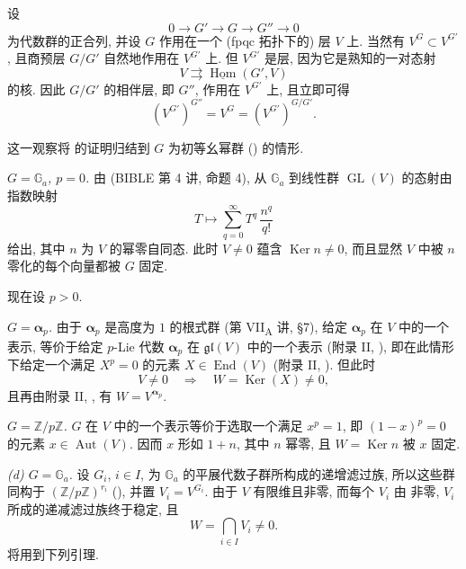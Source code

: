 设
\[
  0\longrightarrow G'\longrightarrow G\longrightarrow G''
    \longrightarrow0
\]
为代数群的正合列, 并设 \(G\) 作用在一个 (fpqc 拓扑下的) 层 \(V\) 上.
当然有 \(V^G\subset V^{G'}\), 且商预层 \(G/G'\) 自然地作用在 \(V^{G'}\) 上.
但 \(V^{G'}\) 是层, 因为它是熟知的一对态射
\[
  V\rightrightarrows\underline{\operatorname{Hom}}(G',V)
\]
的核. 因此 \(G/G'\) 的相伴层, 即 \(G''\), 作用在 \(V^{G'}\) 上, 且立即可得
\[
  \left(V^{G'}\right)^{G''}
  =V^G
  =\left(V^{G'}\right)^{G/G'}.
\]

这一观察将 的证明归结到 \(G\)
为初等幺幂群 () 的情形.

\textit{ \(G=\mathbb G_a\), \(p=0\).}
由 (BIBLE 第 4 讲, 命题 4), 从 \(\mathbb G_a\) 到线性群 \(\operatorname{GL}(V)\)
的态射由指数映射
\[
  T\longmapsto\sum_{q=0}^{\infty}T^q\,\frac{n^q}{q!}
\]
给出, 其中 \(n\) 为 \(V\) 的幂零自同态. 此时 \(V\ne0\) 蕴含
\(\operatorname{Ker}n\ne0\), 而且显然 \(V\) 中被 \(n\) 零化的每个向量都被 \(G\) 固定.

现在设 \(p>0\).

\textit{ \(G=\boldsymbol\alpha_p\).}
由于 \(\boldsymbol\alpha_p\) 是高度为 \(1\) 的根式群
(第 VII\textsubscript{A} 讲, \S7), 给定 \(\boldsymbol\alpha_p\) 在 \(V\) 中的一个表示,
等价于给定 \(p\)-Lie 代数 \(\boldsymbol\alpha_p\) 在 \(\mathfrak{gl}(V)\)
中的一个表示 (附录 II, ),
即在此情形下给定一个满足 \(X^p=0\) 的元素 \(X\in\operatorname{End}(V)\)
(附录 II, ). 但此时
\[
  V\ne0\quad\Longrightarrow\quad
  W=\operatorname{Ker}(X)\ne0,
\]
且再由附录 II, , 有
\(W=V^{\boldsymbol\alpha_p}\).

\textit{ \(G=\mathbb Z/p\mathbb Z\).}
\(G\) 在 \(V\) 中的一个表示等价于选取一个满足 \(x^p=1\), 即 \((1-x)^p=0\)
的元素 \(x\in\operatorname{Aut}(V)\). 因而 \(x\) 形如 \(1+n\), 其中 \(n\) 幂零,
且 \(W=\operatorname{Ker}n\) 被 \(x\) 固定.

\textit{(d) \(G=\mathbb G_a\).}
设 \(G_i\), \(i\in I\), 为 \(\mathbb G_a\) 的平展代数子群所构成的递增滤过族,
所以这些群同构于 \((\mathbb Z/p\mathbb Z)^{r_i}\)
(), 并置 \(V_i=V^{G_i}\).
由于 \(V\) 有限维且非零, 而每个 \(V_i\) 由 非零,
\(V_i\) 所成的递减滤过族终于稳定, 且
\[
  W=\bigcap_{i\in I}V_i\ne0.
\]
将用到下列引理.

